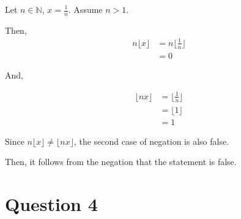 \documentclass[12pt]{article}
\begin{document}
\begin{enumerate}[a.]
    Let $n \in \mathbb{N}$, $x = \frac{1}{n}$. Assume $n > 1$.

    \bigskip

    Then,
    \setcounter{equation}{0}
    \begin{align}
        n \lfloor x \rfloor &= n \lfloor \frac{1}{n} \rfloor\\
        &= 0
    \end{align}

    And,

    \begin{align}
        \lfloor nx \rfloor &= \lfloor \frac{1}{n} \rfloor\\
        &= \lfloor 1 \rfloor\\
        &= 1
    \end{align}

    Since $n\lfloor x \rfloor \neq \lfloor nx \rfloor$, the second case of negation
    is also false.

    \bigskip

    Then, it follows from the negation that the statement is false.

\end{enumerate}

\section*{Question 4}
\end{document}
